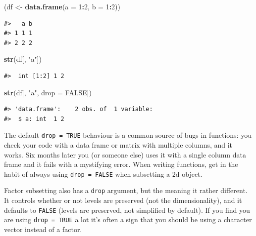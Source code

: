 \documentclass[]{book}
\newenvironment{Shaded}{\begin{snugshade}}{\end{snugshade}}
\newcommand{\KeywordTok}[1]{\textcolor[rgb]{0.13,0.29,0.53}{\textbf{#1}}}
\newcommand{\DataTypeTok}[1]{\textcolor[rgb]{0.13,0.29,0.53}{#1}}
\newcommand{\DecValTok}[1]{\textcolor[rgb]{0.00,0.00,0.81}{#1}}
\newcommand{\StringTok}[1]{\textcolor[rgb]{0.31,0.60,0.02}{#1}}
\newcommand{\OtherTok}[1]{\textcolor[rgb]{0.56,0.35,0.01}{#1}}
\newcommand{\OperatorTok}[1]{\textcolor[rgb]{0.81,0.36,0.00}{\textbf{#1}}}
\newcommand{\NormalTok}[1]{#1}
\theoremstyle{definition}
\theoremstyle{definition}
\theoremstyle{definition}
\theoremstyle{remark}
\begin{document}
\begin{itemize}
\begin{Shaded}
\begin{Highlighting}[]
\NormalTok{(df <-}\StringTok{ }\KeywordTok{data.frame}\NormalTok{(}\DataTypeTok{a =} \DecValTok{1}\OperatorTok{:}\DecValTok{2}\NormalTok{, }\DataTypeTok{b =} \DecValTok{1}\OperatorTok{:}\DecValTok{2}\NormalTok{))}
\end{Highlighting}
\end{Shaded}

\begin{verbatim}
#>   a b
#> 1 1 1
#> 2 2 2
\end{verbatim}

\begin{Shaded}
\begin{Highlighting}[]
\KeywordTok{str}\NormalTok{(df[, }\StringTok{"a"}\NormalTok{])}
\end{Highlighting}
\end{Shaded}

\begin{verbatim}
#>  int [1:2] 1 2
\end{verbatim}

\begin{Shaded}
\begin{Highlighting}[]
\KeywordTok{str}\NormalTok{(df[, }\StringTok{"a"}\NormalTok{, }\DataTypeTok{drop =} \OtherTok{FALSE}\NormalTok{])}
\end{Highlighting}
\end{Shaded}

\begin{verbatim}
#> 'data.frame':    2 obs. of  1 variable:
#>  $ a: int  1 2
\end{verbatim}
\end{itemize}

The default \texttt{drop\ =\ TRUE} behaviour is a common source of bugs
in functions: you check your code with a data frame or matrix with
multiple columns, and it works. Six months later you (or someone else)
uses it with a single column data frame and it fails with a mystifying
error. When writing functions, get in the habit of always using
\texttt{drop\ =\ FALSE} when subsetting a 2d object.

Factor subsetting also has a \texttt{drop} argument, but the meaning it
rather different. It controls whether or not levels are preserved (not
the dimensionality), and it defaults to \texttt{FALSE} (levels are
preserved, not simplified by default). If you find you are using
\texttt{drop\ =\ TRUE} a lot it's often a sign that you should be using
a character vector instead of a factor.
\end{document}
